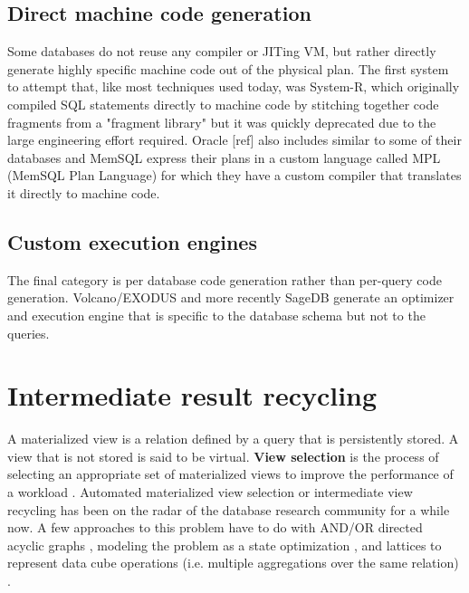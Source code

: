 \subsection{Direct machine code generation}

Some databases do not reuse any compiler or JITing VM, but rather
directly generate highly specific machine code out of the physical
plan. The first system to attempt that, like most techniques used
today, was System-R, which originally compiled SQL statements directly
to machine code by stitching together code fragments from a "fragment
library" \cite{chamberlinHistoryEvaluationSystem1981} but it was quickly
deprecated due to the large engineering effort required. Oracle [ref]
also includes similar to some of their databases and MemSQL express
their plans in a custom language called MPL (MemSQL Plan Language) for
which they have a custom compiler that translates it directly to
machine code.

\subsection{Custom execution engines}

The final category is per database code generation rather than per-query
code generation. Volcano/EXODUS
\cite{graefeVolcanoOptimizerGenerator1993a} and more recently SageDB
\cite{kraskaSageDBLearnedDatabase} generate an optimizer and execution
engine that is specific to the database schema but not to the queries.

\section{Intermediate result recycling}

A materialized view is a relation defined by a query that is
persistently stored. A view that is not stored is said to be
virtual. \textbf{View selection} is the process of selecting an appropriate
set of materialized views to improve the performance of a workload
\cite{mamiSurveyViewSelection2012}.  Automated materialized view
selection or intermediate view recycling has been on the radar of the
database research community for a while now. A few approaches to this
problem have to do with AND/OR directed acyclic graphs
\cite{guptaSelectionViewsMaterialize1997}, modeling the problem as a
state optimization \cite{theodoratosDataWarehouseConfiguration1997},
and lattices to represent data cube operations (i.e. multiple
aggregations over the same relation) \cite{ImplementingDataCubes}.

